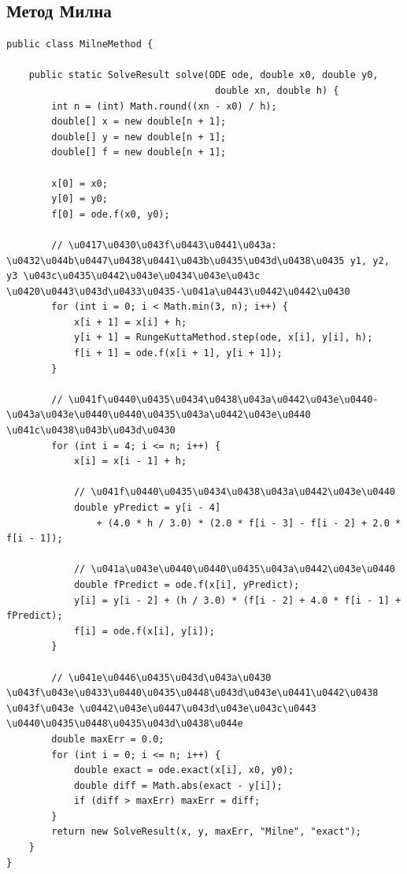 \subsection{Метод Милна}

\begin{lstlisting}[style=javaStyle, label=code:milne]
public class MilneMethod {

    public static SolveResult solve(ODE ode, double x0, double y0,
                                     double xn, double h) {
        int n = (int) Math.round((xn - x0) / h);
        double[] x = new double[n + 1];
        double[] y = new double[n + 1];
        double[] f = new double[n + 1];

        x[0] = x0;
        y[0] = y0;
        f[0] = ode.f(x0, y0);

        // \u0417\u0430\u043f\u0443\u0441\u043a: \u0432\u044b\u0447\u0438\u0441\u043b\u0435\u043d\u0438\u0435 y1, y2, y3 \u043c\u0435\u0442\u043e\u0434\u043e\u043c \u0420\u0443\u043d\u0433\u0435-\u041a\u0443\u0442\u0442\u0430
        for (int i = 0; i < Math.min(3, n); i++) {
            x[i + 1] = x[i] + h;
            y[i + 1] = RungeKuttaMethod.step(ode, x[i], y[i], h);
            f[i + 1] = ode.f(x[i + 1], y[i + 1]);
        }

        // \u041f\u0440\u0435\u0434\u0438\u043a\u0442\u043e\u0440-\u043a\u043e\u0440\u0440\u0435\u043a\u0442\u043e\u0440 \u041c\u0438\u043b\u043d\u0430
        for (int i = 4; i <= n; i++) {
            x[i] = x[i - 1] + h;

            // \u041f\u0440\u0435\u0434\u0438\u043a\u0442\u043e\u0440
            double yPredict = y[i - 4]
                + (4.0 * h / 3.0) * (2.0 * f[i - 3] - f[i - 2] + 2.0 * f[i - 1]);

            // \u041a\u043e\u0440\u0440\u0435\u043a\u0442\u043e\u0440
            double fPredict = ode.f(x[i], yPredict);
            y[i] = y[i - 2] + (h / 3.0) * (f[i - 2] + 4.0 * f[i - 1] + fPredict);
            f[i] = ode.f(x[i], y[i]);
        }

        // \u041e\u0446\u0435\u043d\u043a\u0430 \u043f\u043e\u0433\u0440\u0435\u0448\u043d\u043e\u0441\u0442\u0438 \u043f\u043e \u0442\u043e\u0447\u043d\u043e\u043c\u0443 \u0440\u0435\u0448\u0435\u043d\u0438\u044e
        double maxErr = 0.0;
        for (int i = 0; i <= n; i++) {
            double exact = ode.exact(x[i], x0, y0);
            double diff = Math.abs(exact - y[i]);
            if (diff > maxErr) maxErr = diff;
        }
        return new SolveResult(x, y, maxErr, "Milne", "exact");
    }
}
\end{lstlisting}

